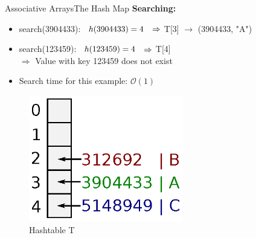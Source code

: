 \begin{frame}{Associative Arrays}{The Hash Map}
  \textbf{Searching:}
  \small
  \begin{itemize}
     \setlength\itemsep{0.75em}
    \item<1->
    search(3904433):
      $\hspace*{0.5em} h(3904433) = 4$
      $\hspace*{0.5em} \Rightarrow$
      T[3] $\rightarrow$ {\color{inkscapeGreen}(3904433, "A")}
    \item<2->
      search(123459):
      $\hspace*{0.5em} h(123459) = 4$
      $\hspace*{0.5em} \Rightarrow$
      T[4] {}\\
      \vspace{0.75em}
      $\Rightarrow$ {\color{red}Value with key 123459 does not exist}
    \item<3->
      Search time for this example: {\color{Mittel-Blau}$\mathcal{O}(1)$}
  \end{itemize}
  \vspace*{-1.0em}
  \begin{figure}
    \caption{Hashtable T}
    \centering
    \includegraphics[width=0.6\textwidth]{Images/Bucket4.eps}
  \end{figure}
\end{frame}


